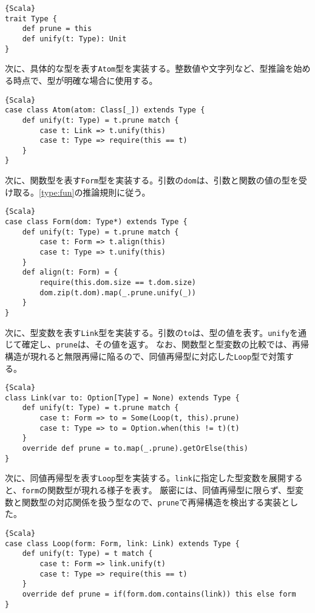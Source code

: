 \documentclass[10pt,a4paper]{book}
\begin{document}
\begin{Verbatim}{Scala}
trait Type {
	def prune = this
	def unify(t: Type): Unit
}
\end{Verbatim}

次に、具体的な型を表す\texttt{Atom}型を実装する。整数値や文字列など、型推論を始める時点で、型が明確な場合に使用する。

\begin{Verbatim}{Scala}
case class Atom(atom: Class[_]) extends Type {
	def unify(t: Type) = t.prune match {
		case t: Link => t.unify(this)
		case t: Type => require(this == t)
	}
}
\end{Verbatim}

次に、関数型を表す\texttt{Form}型を実装する。引数の\texttt{dom}は、引数と関数の値の型を受け取る。\eqref{type:fun}の推論規則に従う。

\begin{Verbatim}{Scala}
case class Form(dom: Type*) extends Type {
	def unify(t: Type) = t.prune match {
		case t: Form => t.align(this)
		case t: Type => t.unify(this)
	}
	def align(t: Form) = {
		require(this.dom.size == t.dom.size)
		dom.zip(t.dom).map(_.prune.unify(_))
	}
}
\end{Verbatim}

次に、型変数を表す\texttt{Link}型を実装する。引数の\texttt{to}は、型の値を表す。\texttt{unify}を通じて確定し、\texttt{prune}は、その値を返す。
なお、関数型と型変数の比較では、再帰構造が現れると無限再帰に陥るので、同値再帰型に対応した\texttt{Loop}型で対策する。

\begin{Verbatim}{Scala}
class Link(var to: Option[Type] = None) extends Type {
	def unify(t: Type) = t.prune match {
		case t: Form => to = Some(Loop(t, this).prune)
		case t: Type => to = Option.when(this != t)(t)
	}
	override def prune = to.map(_.prune).getOrElse(this)
}
\end{Verbatim}

次に、同値再帰型を表す\texttt{Loop}型を実装する。\texttt{link}に指定した型変数を展開すると、\texttt{form}の関数型が現れる様子を表す。
厳密には、同値再帰型に限らず、型変数と関数型の対応関係を扱う型なので、\texttt{prune}で再帰構造を検出する実装とした。

\begin{Verbatim}{Scala}
case class Loop(form: Form, link: Link) extends Type {
	def unify(t: Type) = t match {
		case t: Form => link.unify(t)
		case t: Type => require(this == t)
	}
	override def prune = if(form.dom.contains(link)) this else form
}
\end{Verbatim}
\end{document}
